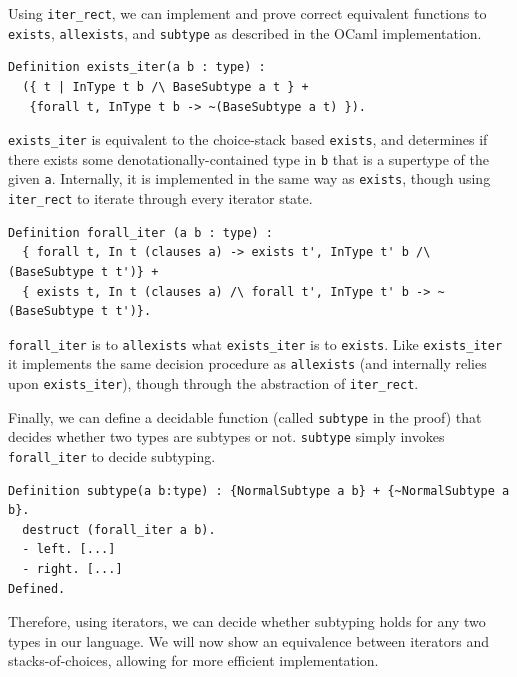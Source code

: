 \documentclass[a4paper,english]{lipics-v2019}
\begin{document}
Using \verb|iter_rect|, we can implement and prove correct equivalent functions
to \verb|exists|, \verb|allexists|, and \verb|subtype| as described in the
OCaml implementation.

\begin{small}\begin{verbatim}
Definition exists_iter(a b : type) : 
  ({ t | InType t b /\ BaseSubtype a t } +
   {forall t, InType t b -> ~(BaseSubtype a t) }).
\end{verbatim}\end{small}

\verb|exists_iter| is equivalent to the choice-stack based \verb|exists|,
and determines if there exists some denotationally-contained type in \verb|b|
that is a supertype of the given \verb|a|. Internally, it is implemented in 
the same way as \verb|exists|, though using \verb|iter_rect| to iterate 
through every iterator state.

\begin{small}\begin{verbatim}
Definition forall_iter (a b : type) :
  { forall t, In t (clauses a) -> exists t', InType t' b /\ (BaseSubtype t t')} +
  { exists t, In t (clauses a) /\ forall t', InType t' b -> ~ (BaseSubtype t t')}.
\end{verbatim}\end{small}

\verb|forall_iter| is to \verb|allexists| what \verb|exists_iter| is to
\verb|exists|. Like \verb|exists_iter| it implements the same decision procedure
as \verb|allexists| (and internally relies upon \verb|exists_iter|), though through
the abstraction of \verb|iter_rect|.

Finally, we can define a decidable function (called \verb|subtype| in the proof)
that decides whether two types are subtypes or not. \verb|subtype| simply invokes
\verb|forall_iter| to decide subtyping.

\begin{small}\begin{verbatim}
Definition subtype(a b:type) : {NormalSubtype a b} + {~NormalSubtype a b}.
  destruct (forall_iter a b).
  - left. [...]
  - right. [...]
Defined.
\end{verbatim}\end{small}

\noindent Therefore, using iterators, we can decide whether subtyping holds for any two types
in our language. We will now show an equivalence between iterators and stacks-of-choices,
allowing for more efficient implementation.
\end{document}
